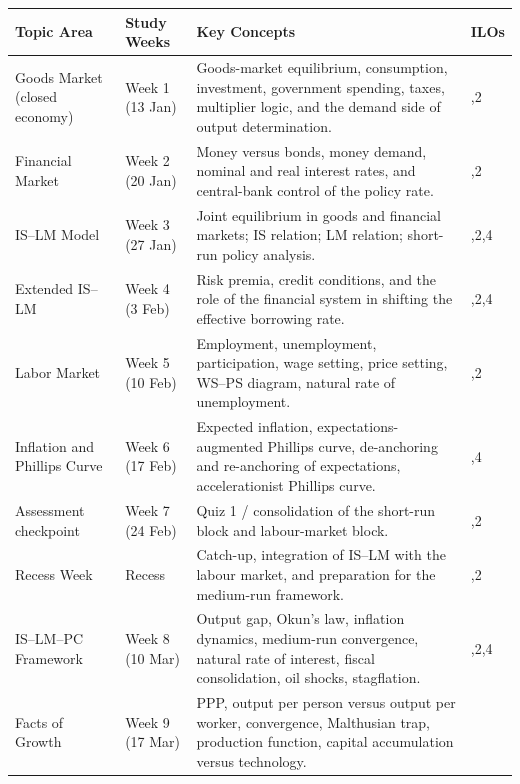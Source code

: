 \documentclass[12pt]{article}
\begin{document}
\begin{center}
\renewcommand{\arraystretch}{1.3}
\setlength{\tabcolsep}{6pt}

\begin{tabularx}{\textwidth}{
|>{\raggedright\arraybackslash}p{3.2cm}
|>{\raggedright\arraybackslash}p{1.6cm}
|>{\raggedright\arraybackslash}X
|>{\raggedright\arraybackslash}p{1.8cm}|
}
\hline
\textbf{Topic Area} & \textbf{Study Weeks} & \textbf{Key Concepts} & \textbf{ILOs} \\
\hline
Goods Market (closed economy) &
Week 1 (13 Jan) &
Goods-market equilibrium, consumption, investment, government spending, taxes, multiplier logic, and the demand side of output determination. &
1,2 \\
\hline
Financial Market &
Week 2 (20 Jan) &
Money versus bonds, money demand, nominal and real interest rates, and central-bank control of the policy rate. &
1,2 \\
\hline
IS--LM Model &
Week 3 (27 Jan) &
Joint equilibrium in goods and financial markets; IS relation; LM relation; short-run policy analysis. &
1,2,4 \\
\hline
Extended IS--LM &
Week 4 (3 Feb) &
Risk premia, credit conditions, and the role of the financial system in shifting the effective borrowing rate. &
1,2,4 \\
\hline
Labor Market &
Week 5 (10 Feb) &
Employment, unemployment, participation, wage setting, price setting, WS--PS diagram, natural rate of unemployment. &
1,2 \\
\hline
Inflation and Phillips Curve &
Week 6 (17 Feb) &
Expected inflation, expectations-augmented Phillips curve, de-anchoring and re-anchoring of expectations, accelerationist Phillips curve. &
2,4 \\
\hline
Assessment checkpoint &
Week 7 (24 Feb) &
Quiz 1 / consolidation of the short-run block and labour-market block. &
1,2 \\
\hline
Recess Week &
Recess &
Catch-up, integration of IS--LM with the labour market, and preparation for the medium-run framework. &
1,2 \\
\hline
IS--LM--PC Framework &
Week 8 (10 Mar) &
Output gap, Okun's law, inflation dynamics, medium-run convergence, natural rate of interest, fiscal consolidation, oil shocks, stagflation. &
1,2,4 \\
\hline
Facts of Growth &
Week 9 (17 Mar) &
PPP, output per person versus output per worker, convergence, Malthusian trap, production function, capital accumulation versus technology. &
3 \\

\end{tabularx}
\end{center}
\end{document}
